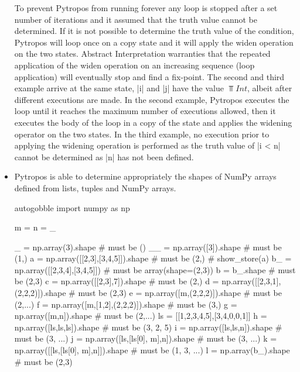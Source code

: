 \begin{itemize}
  To prevent Pytropos from running forever any loop is stopped after a set number of
  iterations and it assumed that the truth value cannot be determined.  If it is not
  possible to determine the truth value of the condition, Pytropos will loop once on a copy
  state and it will apply the widen operation on the two states. Abstract Interpretation
  warranties that the repeated application of the widen operation on an increasing
  sequence (loop application) will eventually stop and find a fix-point. The second and
  third example arrive at the same state, \pycode|i| and \pycode|j| have the value
  $\Top{Int}$, albeit after different executions are made. In the second example,
  Pytropos executes the loop until it reaches the maximum number of executions allowed,
  then it executes the body of the loop in a copy of the state and applies the widening
  operator on the two states. In the third example, no execution prior to applying the
  widening operation is performed as the truth value of \pycode|i < n| cannot be
  determined as \pycode|n| has not been defined.

\item Pytropos is able to determine appropriately the shapes of NumPy arrays defined from
  lists, tuples and NumPy arrays.

  \begin{pythoncode*}{autogobble}
    import numpy as np

    m = n = _

    _ = np.array(3).shape                   # must be ()
    __ = np.array([3]).shape                # must be (1,)
    a = np.array([[2,3],[3,4,5]]).shape     # must be (2,)
    # show_store(a)
    b_ = np.array([[2,3,4],[3,4,5]])        # must be array(shape=(2,3))
    b = b_.shape                            # must be (2,3)
    c = np.array([[2,3],7]).shape           # must be (2,)
    d = np.array([[2,3,1],(2,2,2)]).shape   # must be (2,3)
    e = np.array([m,(2,2,2)]).shape         # must be (2,...)
    f = np.array([m,[1,2],(2,2,2)]).shape   # must be (3,)
    g = np.array([m,n]).shape               # must be (2,...)
    ls = [[1,2,3,4,5],[3,4,0,0,1]]
    h = np.array([ls,ls,ls]).shape          # must be (3, 2, 5)
    i = np.array([ls,ls,n]).shape           # must be (3, ...)
    j = np.array([ls,[ls[0], m],n]).shape   # must be (3, ...)
    k = np.array([[ls,[ls[0], m],n]]).shape # must be (1, 3, ...)
    l = np.array(b_).shape                  # must be (2,3)
  \end{pythoncode*}


\end{itemize}
